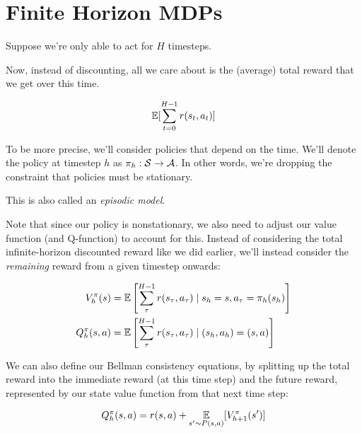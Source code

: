 \documentclass[../main/main]{subfiles}
\begin{document}
\section{Finite Horizon MDPs}

Suppose we're only able to act for $H$ timesteps.


Now, instead of discounting, all we care about is the (average) total reward
that we get over this time.

\[ \operatorname*{\mathbb{E}}[ \sum_{t=0}^{H-1} r(s_t, a_t) ] \]

To be more precise, we'll consider policies that depend on the time.
We'll denote the policy at timestep $h$ as $\pi_h : \mathcal{S} \to \mathcal{A}$. In other
words, we're dropping the constraint that policies must be stationary.

This is also called an \emph{episodic model}.



Note that since our policy is nonstationary, we also need to adjust our value
function (and Q-function) to account for this.
Instead of considering the total infinite-horizon discounted reward like we did
earlier,
we'll instead consider the \emph{remaining} reward from a given timestep
onwards:

\begin{align*}
    V^\pi_h(s) &= \operatorname*{\mathbb{E}} \left[ \sum_\tau^{H-1} r(s_\tau, a_\tau) \mid s_h = s, a_\tau = \pi_h(s_h) \right] \\
    Q^\pi_h(s, a) &= \operatorname*{\mathbb{E}} \left[ \sum_\tau^{H-1} r(s_\tau, a_\tau) \mid (s_h, a_h) = (s, a) \right]
\end{align*}


We can also define our Bellman consistency equations, by splitting up the total
reward into the immediate reward (at this time step) and the future reward,
represented by our state value function from that next time step:

\[
    Q^\pi_h(s, a) = r(s, a) + \operatorname*{\mathbb{E}}_{s' \sim P(s, a)}[V^\pi_{h+1}(s')]
\]
\end{document}

